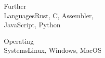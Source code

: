 \documentclass[a4paper,10pt]{cv}
\begin{document}
      \begin{multicols}{2}
        \begin{cvSkillGroup}{Further\\ Languages}{Rust, C, Assembler,\\ JavaScript, Python}
        \end{cvSkillGroup}
        \begin{cvSkillGroup}{Operating\\ Systems}{Linux, Windows, MacOS}
        \end{cvSkillGroup}

\end{multicols}
\end{document}
